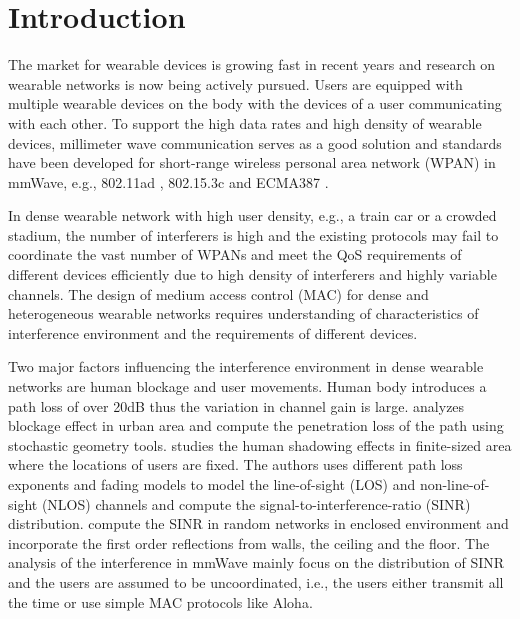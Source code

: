 \documentclass[10pt, conference, letterpaper]{IEEEtran}
\begin{document}
\section{Introduction}\label{section:introduction}

The market for wearable devices is growing fast in recent years \cite{wearable} and research on wearable networks is now being actively pursued.  Users are equipped with multiple wearable devices on the body with the devices of a user communicating with each other. To support the high data rates and high density of wearable devices, millimeter wave communication serves as a good solution and standards have been developed for short-range wireless personal area network (WPAN) in mmWave, e.g., 802.11ad \cite{80211ad}, 802.15.3c \cite{802153c} and ECMA387 \cite{ECMA387}. 

In dense wearable network with high user density, e.g., a train car or a crowded stadium, the number of interferers is high and the existing protocols may fail to coordinate the vast number of WPANs and meet the QoS requirements of different devices efficiently due to high density of interferers and highly variable channels. The design of medium access control (MAC) for dense and heterogeneous wearable networks requires understanding of characteristics of interference environment and the requirements of different devices.

Two major factors influencing the interference environment in dense wearable networks are human blockage and user movements. Human body introduces a path loss of over 20dB \cite{humanshadowing} thus the variation in channel gain is large. \cite{urbanblockage} analyzes blockage effect in urban area and compute the penetration loss of the path using stochastic geometry tools. \cite{interferencefinitesized} studies the human shadowing effects in finite-sized area where the locations of users are fixed. The authors uses different path loss exponents and fading models to model the line-of-sight (LOS) and non-line-of-sight (NLOS) channels and compute the signal-to-interference-ratio (SINR) distribution. \cite{enclosedmmwave} compute the SINR in random networks in enclosed environment and incorporate the first order reflections from walls, the ceiling and the floor. The analysis of the interference in mmWave mainly focus on the distribution of SINR and the users are assumed to be uncoordinated, i.e., the users either transmit all the time or use simple MAC protocols like Aloha. 
\end{document}
